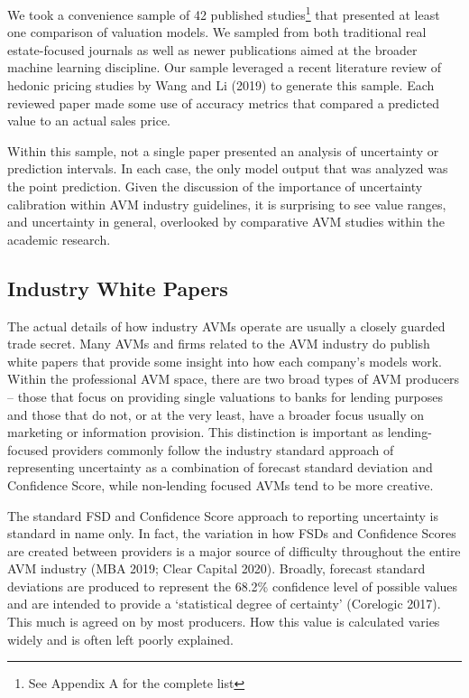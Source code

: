 \documentclass[colTwo]{anon}
\theoremstyle{definition}
\begin{document}
We took a convenience sample of 42 published studies\footnote{See Appendix A for the complete list} that presented at least one comparison of valuation models. We sampled from both traditional real estate-focused journals as well as newer publications aimed at the broader machine learning discipline. Our sample leveraged a recent literature review of hedonic pricing studies by Wang and Li (2019) to generate this sample.  Each reviewed paper made some use of accuracy metrics that compared a predicted value to an actual sales price.  

Within this sample, not a single paper presented an analysis of uncertainty or prediction intervals. In each case, the only model output that was analyzed was the point prediction.  Given the discussion of the importance of uncertainty calibration within AVM industry guidelines, it is surprising to see value ranges, and uncertainty in general, overlooked by comparative AVM studies within the academic research.  

\subsection{Industry White Papers}

The actual details of how industry AVMs operate are usually a closely guarded trade secret. Many AVMs and firms related to the AVM industry do publish white papers that provide some insight into how each company’s models work.   Within the professional AVM space, there are two broad types of AVM producers -- those that focus on providing single valuations to banks for lending purposes and those that do not, or at the very least, have a broader focus usually on marketing or information provision.  This distinction is important as lending-focused providers commonly follow the industry standard approach of representing uncertainty as a combination of forecast standard deviation and Confidence Score, while non-lending focused AVMs tend to be more creative.

The standard FSD and Confidence Score approach to reporting uncertainty is standard in name only. In fact, the variation in how FSDs and Confidence Scores are created between providers is a major source of difficulty throughout the entire AVM industry (MBA 2019; Clear Capital 2020).  Broadly, forecast standard deviations are produced to represent the 68.2\% confidence level of possible values and are intended to provide a ‘statistical degree of certainty’ (Corelogic 2017).  This much is agreed on by most producers.  How this value is calculated varies widely and is often left poorly explained.  
\end{document}

